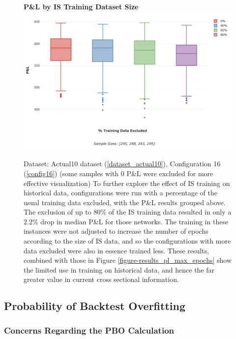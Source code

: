 \documentclass[a4paper,11pt,oneside]{article}
\theoremstyle{plain}
\theoremstyle{definition}
\begin{document}
\begin{figure}[H]
	\centering 
	\textbf{P\&L by IS Training Dataset Size}
	\includegraphics[scale=0.4]{images/results/data/training_data_excluded.png}
	\caption[P\&L by IS Training Dataset Size]{
		Dataset: Actual10 dataset (\ref{dataset_actual10}), Configuration 16 (\ref{config16}) (some samples with 0 P\&L were excluded for more effective visualization)
		\newline To further explore the effect of IS training on historical data, configurations were run with a percentage of the usual training data excluded, with the P\&L results grouped above. The exclusion of up to 80\% of the IS training data resulted in only a 2.2\% drop in median P\&L for those networks. The training in these instances were not adjusted to increase the number of epochs according to the size of IS data, and so the configurations with more data excluded were also in essence trained less. These results, combined with those in Figure \ref{figure-results_pl_max_epochs} show the limited use in training on historical data, and hence the far greater value in current cross sectional information.}
	\label{figure-results_it3_validationset}
\end{figure}


\newpage

\subsection{Probability of Backtest Overfitting}\label{results_pbo}


\subsubsection{Concerns Regarding the PBO Calculation}\label{results_pboconcerns}
\end{document}
